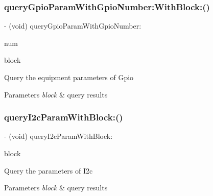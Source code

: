 \subsubsection{\texorpdfstring{query\+Gpio\+Param\+With\+Gpio\+Number\+:\+With\+Block\+:()}{queryGpioParamWithGpioNumber:WithBlock:()}}
{\footnotesize\ttfamily -\/ (void) query\+Gpio\+Param\+With\+Gpio\+Number\+: \begin{DoxyParamCaption}\item[{(N\+S\+Integer)}]{num }\item[{WithBlock:(P\+V\+Query\+Gpio\+Param\+Block)}]{block }\end{DoxyParamCaption}}

Query the equipment parameters of Gpio


\begin{DoxyParams}{Parameters}
{\em block} & query results \\
\hline
\end{DoxyParams}
\mbox{\label{interface_p_v_mount_controller_a8d3a80dc85723aa615212453f60c04d1}} 
\subsubsection{\texorpdfstring{query\+I2c\+Param\+With\+Block\+:()}{queryI2cParamWithBlock:()}}
{\footnotesize\ttfamily -\/ (void) query\+I2c\+Param\+With\+Block\+: \begin{DoxyParamCaption}\item[{(P\+V\+Query\+I2c\+Param\+Block)}]{block }\end{DoxyParamCaption}}

Query the parameters of I2c


\begin{DoxyParams}{Parameters}
{\em block} & query results \\
\hline
\end{DoxyParams}
\mbox{\label{interface_p_v_mount_controller_ae220babadb47279f451b443192f7c0d2}} 

